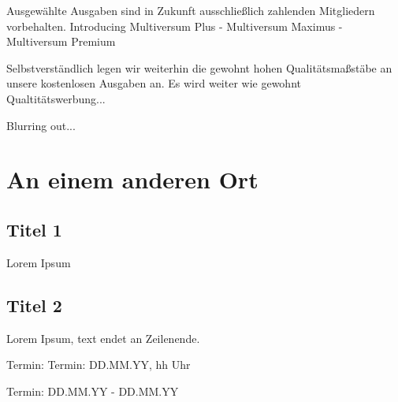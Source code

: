 Ausgewählte Ausgaben sind in Zukunft ausschließlich zahlenden Mitgliedern vorbehalten. Introducing Multiversum Plus
- Multiversum Maximus
- Multiversum Premium

Selbstverständlich legen wir weiterhin die gewohnt hohen Qualitätsmaßstäbe an unsere kostenlosen Ausgaben an. Es wird weiter wie gewohnt Qualtitätswerbung...

Blurring out...

\section{An einem anderen Ort}

\subsection{Titel 1}
Lorem Ipsum

\subsection{Titel 2}
Lorem Ipsum, text endet an Zeilenende.


\begin{termine}
\item Termin: Termin: DD.MM.YY, hh Uhr
  \item Termin: DD.MM.YY - DD.MM.YY
\end{termine}
\impressum


